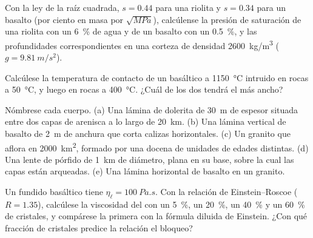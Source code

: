 \begin{exercise}[$\star$]\label{exo:b2:magma-emplacement:2}
Con la ley de la raíz cuadrada, $s = 0.44$ para una riolita y $s = 0.34$ para un basalto
(por ciento en masa por $\sqrt{\unit{MPa}}$), calcúlense la presión de saturación de una
riolita con un \qty{6}{\percent} de agua y de un basalto con un \qty{0.5}{\percent},
y las profundidades correspondientes en una corteza de densidad \qty{2600}{kg/m^3}
($g = \qty{9.81}{m/s^2}$).
\end{exercise}

\begin{exercise}[$\star$]\label{exo:b2:magma-emplacement:3}
Calcúlese la temperatura de contacto de un  basáltico a \qty{1150}{\celsius}
intruido en rocas a \qty{50}{\celsius}, y luego en rocas a
\qty{400}{\celsius}. ¿Cuál de los dos  tendrá el  más ancho?
\end{exercise}

\begin{exercise}[$\star$]\label{exo:b2:magma-emplacement:4}
Nómbrese cada cuerpo. (a) Una lámina de dolerita de \qty{30}{m} de espesor situada entre dos capas
de arenisca a lo largo de \qty{20}{km}. (b) Una lámina vertical de basalto de \qty{2}{m} de anchura
que corta calizas horizontales. (c) Un granito que aflora en \qty{2000}{km^2},
formado por una docena de unidades de edades distintas. (d) Una lente de pórfido de \qty{1}{km} de diámetro,
plana en su base, sobre la cual las capas están arqueadas. (e) Una lámina horizontal
de basalto en un granito.
\end{exercise}

\begin{exercise}[$\star\star$]\label{exo:b2:magma-emplacement:5}
Un fundido basáltico tiene $\eta_{\ell} = \qty{100}{Pa.s}$. Con la relación de Einstein--Roscoe
($R = 1.35$), calcúlese la viscosidad del  con un
\qty{5}{\percent}, un \qty{20}{\percent}, un \qty{40}{\percent} y un \qty{60}{\percent} de
cristales, y compárese la primera con la fórmula diluida de Einstein. ¿Con qué fracción
de cristales predice la relación el bloqueo?
\end{exercise}

